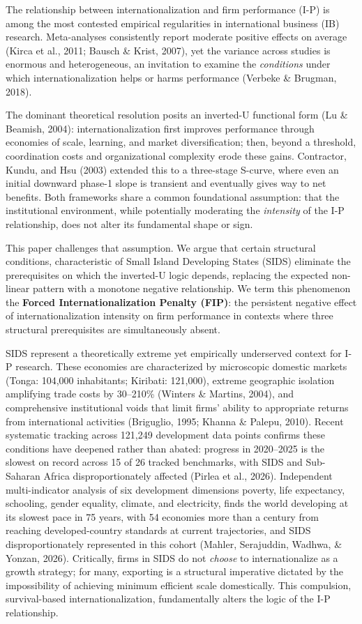 \documentclass[
  12pt]{article}
\begin{document}
The relationship between internationalization and firm performance (I-P)
is among the most contested empirical regularities in international
business (IB) research. Meta-analyses consistently report moderate
positive effects on average (Kirca et al., 2011; Bausch \& Krist, 2007),
yet the variance across studies is enormous and heterogeneous, an
invitation to examine the \emph{conditions} under which
internationalization helps or harms performance (Verbeke \& Brugman,
2018).

The dominant theoretical resolution posits an inverted-U functional form
(Lu \& Beamish, 2004): internationalization first improves performance
through economies of scale, learning, and market diversification; then,
beyond a threshold, coordination costs and organizational complexity
erode these gains. Contractor, Kundu, and Hsu (2003) extended this to a
three-stage S-curve, where even an initial downward phase-1 slope is
transient and eventually gives way to net benefits. Both frameworks
share a common foundational assumption: that the institutional
environment, while potentially moderating the \emph{intensity} of the
I-P relationship, does not alter its fundamental shape or sign.

This paper challenges that assumption. We argue that certain structural
conditions, characteristic of Small Island Developing States (SIDS)
eliminate the prerequisites on which the inverted-U logic depends,
replacing the expected non-linear pattern with a monotone negative
relationship. We term this phenomenon the \textbf{Forced
Internationalization Penalty (FIP)}: the persistent negative effect of
internationalization intensity on firm performance in contexts where
three structural prerequisites are simultaneously absent.

SIDS represent a theoretically extreme yet empirically underserved
context for I-P research. These economies are characterized by
microscopic domestic markets (Tonga: 104,000 inhabitants; Kiribati:
121,000), extreme geographic isolation amplifying trade costs by
30--210\% (Winters \& Martins, 2004), and comprehensive institutional
voids that limit firms' ability to appropriate returns from
international activities (Briguglio, 1995; Khanna \& Palepu, 2010).
Recent systematic tracking across 121,249 development data points
confirms these conditions have deepened rather than abated: progress in
2020--2025 is the slowest on record across 15 of 26 tracked benchmarks,
with SIDS and Sub-Saharan Africa disproportionately affected (Pirlea et
al., 2026). Independent multi-indicator analysis of six development
dimensions poverty, life expectancy, schooling, gender equality,
climate, and electricity, finds the world developing at its slowest pace
in 75 years, with 54 economies more than a century from reaching
developed-country standards at current trajectories, and SIDS
disproportionately represented in this cohort (Mahler, Serajuddin,
Wadhwa, \& Yonzan, 2026). Critically, firms in SIDS do not \emph{choose}
to internationalize as a growth strategy; for many, exporting is a
structural imperative dictated by the impossibility of achieving minimum
efficient scale domestically. This compulsion, survival-based
internationalization, fundamentally alters the logic of the I-P
relationship.
\end{document}

